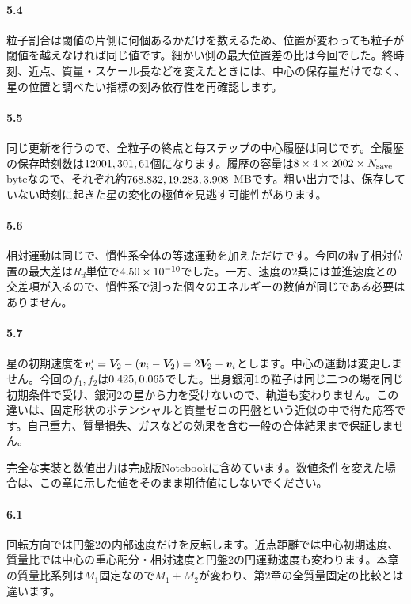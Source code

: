 \paragraph{5.4}
粒子割合は閾値の片側に何個あるかだけを数えるため、位置が変わっても粒子が閾値を越えなければ同じ値です。細かい側の最大位置差の比は今回\chfivevalLastRatio でした。終時刻、近点、質量・スケール長などを変えたときには、中心の保存量だけでなく、星の位置と調べたい指標の刻み依存性を再確認します。

\paragraph{5.5}
同じ更新を行うので、全粒子の終点と毎ステップの中心履歴は同じです。全履歴の保存時刻数は$12001,301,61$個になります。履歴の容量は$8\times4\times2002\times N_{\rm save}$ byteなので、それぞれ約$768.832,19.283,3.908$ MBです。粗い出力では、保存していない時刻に起きた星の変化の極値を見逃す可能性があります。

\paragraph{5.6}
相対運動は同じで、慣性系全体の等速運動を加えただけです。今回の粒子相対位置の最大差は$R_d$単位で$4.50\times 10^{-10}$でした。一方、速度の2乗には並進速度との交差項が入るので、慣性系で測った個々のエネルギーの数値が同じである必要はありません。

\paragraph{5.7}
星の初期速度を$\boldsymbol v_i'=\boldsymbol V_2-(\boldsymbol v_i-\boldsymbol V_2)=2\boldsymbol V_2-\boldsymbol v_i$とします。中心の運動は変更しません。今回の$f_1,f_2$は$0.425,0.065$でした。出身銀河1の粒子は同じ二つの場を同じ初期条件で受け、銀河2の星から力を受けないので、軌道も変わりません。この違いは、固定形状のポテンシャルと質量ゼロの円盤という近似の中で得た応答です。自己重力、質量損失、ガスなどの効果を含む一般の合体結果まで保証しません。

\medskip
完全な実装と数値出力は完成版Notebookに含めています。数値条件を変えた場合は、この章に示した値をそのまま期待値にしないでください。



\paragraph{6.1}
回転方向では円盤2の内部速度だけを反転します。近点距離では中心初期速度、質量比では中心の重心配分・相対速度と円盤2の円運動速度も変わります。本章の質量比系列は$M_1$固定なので$M_1+M_2$が変わり、第2章の全質量固定の比較とは違います。

